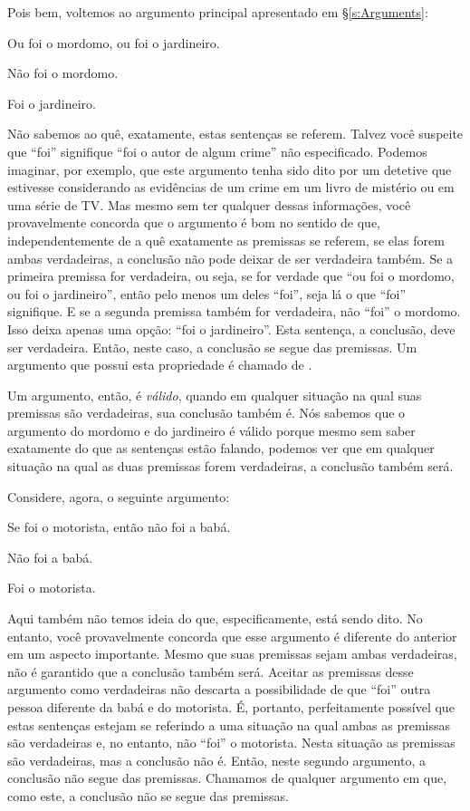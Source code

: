 Pois bem, voltemos ao argumento principal apresentado em \S\ref{s:Arguments}: 

	\begin{earg}
		\item[] Ou foi o mordomo, ou foi o jardineiro.
		\item[] Não foi o mordomo.
		\item[\therefore] Foi o jardineiro.
	\end{earg}
Não sabemos ao quê, exatamente, estas sentenças se referem.
Talvez você suspeite que ``foi'' signifique ``foi o autor de algum crime'' não especificado.
Podemos imaginar, por exemplo, que este argumento tenha sido dito por um detetive que estivesse considerando as evidências de um crime em um livro de mistério ou em uma série de TV.
Mas mesmo sem ter qualquer dessas informações, você provavelmente concorda que o argumento é bom no sentido de que, independentemente de a quê exatamente as premissas se referem, se elas forem ambas verdadeiras, a conclusão não pode deixar de ser verdadeira também.
Se a primeira premissa for verdadeira, ou seja, se for verdade que ``ou foi o mordomo, ou foi o jardineiro'', então pelo menos um deles ``foi'', seja lá o que ``foi'' signifique.
E se a segunda premissa também for verdadeira, não ``foi'' o mordomo.
Isso deixa apenas uma opção: ``foi o jardineiro''. Esta sentença, a conclusão, deve ser verdadeira.
Então, neste caso, a conclusão se segue das premissas.
Um argumento que possui esta propriedade é chamado de .

Um argumento, então, é \emph{válido}, quando em qualquer situação na qual suas premissas são verdadeiras, sua conclusão também é.
Nós sabemos que o argumento do mordomo e do jardineiro é válido porque mesmo sem saber exatamente do que as sentenças estão falando, podemos ver que em qualquer situação na qual as duas premissas forem verdadeiras, a conclusão também será.

Considere, agora, o seguinte argumento:
\begin{earg}\label{argMaidDriver}
	\item[] Se foi o motorista, então não foi a babá.
	\item[] Não foi a babá.
	\item[\therefore] Foi o motorista.
\end{earg}
Aqui também não temos ideia do que, especificamente, está sendo dito.
No entanto, você provavelmente concorda que esse argumento é diferente do anterior em um aspecto importante.
Mesmo que suas premissas sejam ambas verdadeiras, não é garantido que a conclusão também será.
Aceitar as premissas desse argumento como verdadeiras não descarta a possibilidade de que ``foi'' outra pessoa diferente da babá e do motorista.
É, portanto, perfeitamente possível que estas sentenças estejam se referindo a uma situação na qual  ambas as premissas são verdadeiras e, no entanto, não ``foi'' o motorista.
Nesta situação as premissas são verdadeiras, mas a conclusão não é.
Então, neste segundo argumento, a conclusão não segue das premissas.
Chamamos de  qualquer argumento em que, como este, a conclusão não se segue das premissas.

